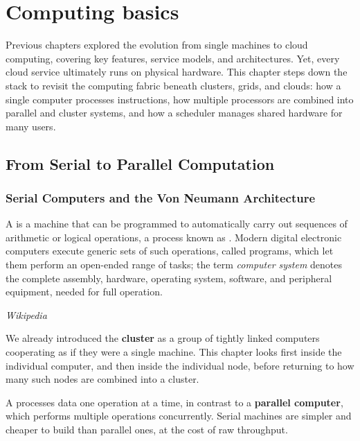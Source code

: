\chapter{Computing basics} \label{ch:computing_basics}

Previous chapters explored the evolution from single machines to cloud computing, covering key features, service models, and architectures. Yet, every cloud service ultimately runs on physical hardware. This chapter steps down the stack to revisit the computing fabric beneath clusters, grids, and clouds: how a single computer processes instructions, how multiple processors are combined into parallel and cluster systems, and how a scheduler manages shared hardware for many users.

\section{From Serial to Parallel Computation} \label{sec:serial_parallel}

\subsection{Serial Computers and the Von Neumann Architecture}

\begin{definitionblock}[Computer]
    A  is a machine that can be programmed to automatically carry out sequences of arithmetic or logical operations, a process known as . Modern digital electronic computers execute generic sets of such operations, called programs, which let them perform an open-ended range of tasks; the term \textit{computer system} denotes the complete assembly, hardware, operating system, software, and peripheral equipment, needed for full operation.

    \hfill \textit{Wikipedia}
\end{definitionblock}

We already introduced the \textbf{cluster} as a group of tightly linked computers cooperating as if they were a single machine. This chapter looks first inside the individual computer, and then inside the individual node, before returning to how many such nodes are combined into a cluster.

\begin{definitionblock}
    A  processes data one operation at a time, in contrast to a \textbf{parallel computer}, which performs multiple operations concurrently. Serial machines are simpler and cheaper to build than parallel ones, at the cost of raw throughput.
\end{definitionblock}


